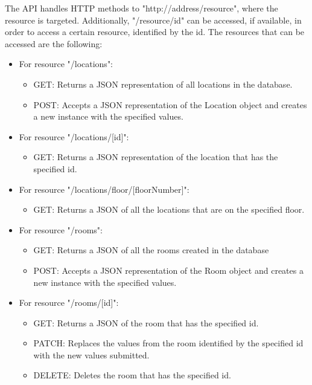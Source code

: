 The API handles HTTP methods to "http://address/resource", where the resource is targeted. Additionally, "/resource/id" can be accessed, if available, in order to access a certain resource, identified by the id. The resources that can be accessed are the following:
\begin{itemize}
    \item For resource "/locations":
    \begin{itemize}
        \item GET: Returns a JSON representation of all locations in the database.
        \item POST: Accepts a JSON representation of the Location object and creates a new instance with the specified values.
    \end{itemize}
    
    \item For resource "/locations/[id]":
    \begin{itemize}
        \item GET: Returns a JSON representation of the location that has the specified id.
    \end{itemize}
    
    \item For resource "/locations/floor/[floorNumber]":
    \begin{itemize}
        \item GET: Returns a JSON of all the locations that are on the specified floor.
    \end{itemize}
    
    \item For resource "/rooms":
    \begin{itemize}
        \item GET: Returns a JSON of all the rooms created in the database
        \item POST: Accepts a JSON representation of the Room object and creates a new instance with the specified values.
    \end{itemize}
    
    \item For resource "/rooms/[id]":
    \begin{itemize}
        \item GET: Returns a JSON of the room that has the specified id.
        \item PATCH: Replaces the values from the room identified by the specified id with the new values submitted.
        \item DELETE: Deletes the room that has the specified id.
    \end{itemize}
    

\end{itemize}
